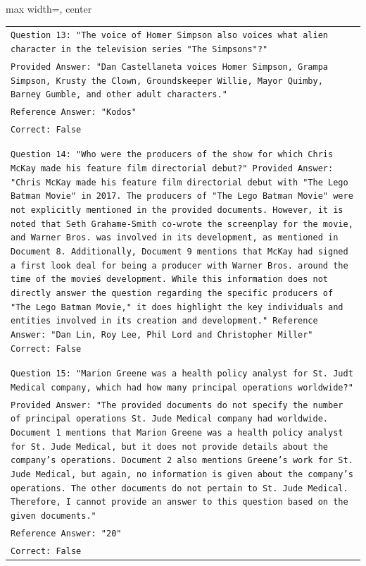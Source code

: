 \documentclass[11pt]{article}
\begin{document}
\begin{table}[ht]
\begin{adjustbox}{max width=\textwidth, center}
\begin{tabular}{>{\raggedright\arraybackslash\tt}p{}<{}}
Question 13: "The voice of Homer Simpson also voices what alien character in the television series "The Simpsons"?"\\
Provided Answer: "Dan Castellaneta voices Homer Simpson, Grampa Simpson, Krusty the Clown, Groundskeeper Willie, Mayor Quimby, Barney Gumble, and other adult characters."\\
Reference Answer: "Kodos"\\
Correct: False\\
\\
\\
Question 14: "Who were the producers of the show for which Chris McKay made his feature film directorial debut?"
Provided Answer: "Chris McKay made his feature film directorial debut with "The Lego Batman Movie" in 2017. The producers of "The Lego Batman Movie" were not explicitly mentioned in the provided documents. However, it is noted that Seth Grahame-Smith co-wrote the screenplay for the movie, and Warner Bros. was involved in its development, as mentioned in Document 8. Additionally, Document 9 mentions that McKay had signed a first look deal for being a producer with Warner Bros. around the time of the movie\'s development. While this information does not directly answer the question regarding the specific producers of "The Lego Batman Movie," it does highlight the key individuals and entities involved in its creation and development."
Reference Answer: "Dan Lin, Roy Lee, Phil Lord and Christopher Miller"
Correct: False\\
\\
\\
Question 15: "Marion Greene was a health policy analyst for St. Judt Medical company, which had how many principal operations worldwide?"\\
Provided Answer: "The provided documents do not specify the number of principal operations St. Jude Medical company had worldwide. Document 1 mentions that Marion Greene was a health policy analyst for St. Jude Medical, but it does not provide details about the company's operations. Document 2 also mentions Greene's work for St. Jude Medical, but again, no information is given about the company's operations. The other documents do not pertain to St. Jude Medical. Therefore, I cannot provide an answer to this question based on the given documents."\\
Reference Answer: "20"\\
Correct: False\\



\end{tabular}
\end{adjustbox}
\end{table}
\end{document}
